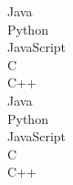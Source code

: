 \documentclass[]{friggeri-cv} %
\begin{document}
    \begin{minipage}[t]{0.5\linewidth}
\begin{flushright}

Java\quad{\color{red} $\varheartsuit\varheartsuit\varheartsuit\varheartsuit\varheartsuit\varheartsuit\varheartsuit\varheartsuit\varheartsuit\varheartsuit\varheartsuit\varheartsuit\varheartsuit\varheartsuit\varheartsuit$}{\color{black} $\varheartsuit$} \\
Python\quad{\color{red} $\varheartsuit\varheartsuit\varheartsuit\varheartsuit\varheartsuit\varheartsuit\varheartsuit\varheartsuit\varheartsuit\varheartsuit\varheartsuit\varheartsuit\varheartsuit$}{\color{black} $\varheartsuit\varheartsuit\varheartsuit$} \\ 
JavaScript\quad{\color{red} $\varheartsuit\varheartsuit\varheartsuit\varheartsuit\varheartsuit\varheartsuit\varheartsuit\varheartsuit\varheartsuit\varheartsuit\varheartsuit\varheartsuit\varheartsuit\varheartsuit$}{\color{black} $\varheartsuit\varheartsuit$} \\ 
 C\quad{\color{red} $\varheartsuit\varheartsuit\varheartsuit\varheartsuit\varheartsuit\varheartsuit\varheartsuit\varheartsuit\varheartsuit\varheartsuit\varheartsuit\varheartsuit\varheartsuit\varheartsuit$}{\color{black} $\varheartsuit\varheartsuit$} \\
 C++\quad{\color{red} $\varheartsuit\varheartsuit\varheartsuit\varheartsuit\varheartsuit\varheartsuit\varheartsuit\varheartsuit\varheartsuit\varheartsuit\varheartsuit\varheartsuit\varheartsuit\varheartsuit$}{\color{black} $\varheartsuit\varheartsuit$} \\
 Java\quad{\color{red} $\varheartsuit\varheartsuit\varheartsuit\varheartsuit\varheartsuit\varheartsuit\varheartsuit\varheartsuit\varheartsuit\varheartsuit\varheartsuit\varheartsuit\varheartsuit\varheartsuit\varheartsuit$}{\color{black} $\varheartsuit$} \\
Python\quad{\color{red} $\varheartsuit\varheartsuit\varheartsuit\varheartsuit\varheartsuit\varheartsuit\varheartsuit\varheartsuit\varheartsuit\varheartsuit\varheartsuit\varheartsuit\varheartsuit$}{\color{black} $\varheartsuit\varheartsuit\varheartsuit$} \\ 
JavaScript\quad{\color{red} $\varheartsuit\varheartsuit\varheartsuit\varheartsuit\varheartsuit\varheartsuit\varheartsuit\varheartsuit\varheartsuit\varheartsuit\varheartsuit\varheartsuit\varheartsuit\varheartsuit$}{\color{black} $\varheartsuit\varheartsuit$} \\ 
 C\quad{\color{red} $\varheartsuit\varheartsuit\varheartsuit\varheartsuit\varheartsuit\varheartsuit\varheartsuit\varheartsuit\varheartsuit\varheartsuit\varheartsuit\varheartsuit\varheartsuit\varheartsuit$}{\color{black} $\varheartsuit\varheartsuit$} \\
 C++\quad{\color{red} $\varheartsuit\varheartsuit\varheartsuit\varheartsuit\varheartsuit\varheartsuit\varheartsuit\varheartsuit\varheartsuit\varheartsuit\varheartsuit\varheartsuit\varheartsuit\varheartsuit$}{\color{black} $\varheartsuit\varheartsuit$} \\


\end{flushright}
\end{minipage}
\end{document}

